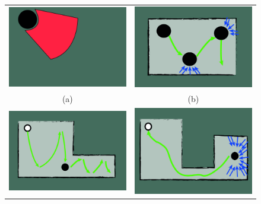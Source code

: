 \begin{figure}[ht!]
     \begin{tabular}{cc}
     \centering
        \includegraphics[width=.45\textwidth]{images/exploration1.jpg}&
        \includegraphics[width=.45\textwidth]{images/exploration2.jpg}\\
        (a)&(b)\\
        \includegraphics[width=.49\textwidth]{images/exploration3.jpg}&
        \includegraphics[width=.45\textwidth]{images/exploration4.jpg}\\

\end{tabular}
\end{figure}
